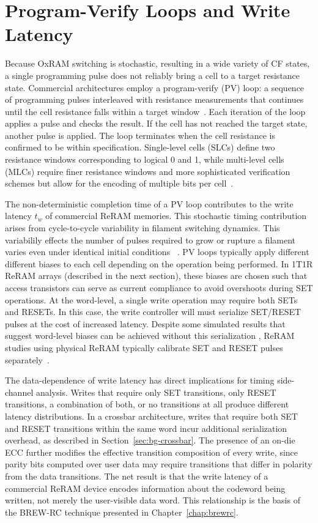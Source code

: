 \section{Program-Verify Loops and Write Latency}
\label{sec:bg-pvloops}

Because OxRAM switching is stochastic, resulting in a wide variety of CF
states, a single programming pulse does not reliably bring a cell to a
target resistance state. Commercial architectures employ a
program-verify (PV) loop: a sequence of programming pulses interleaved
with resistance measurements that continues until the cell resistance
falls within a target window~\cite{
	kawahara2013filament,hayakawa2015highly,grossi2015impact,mao2016optimizing,
	milo2021accurate, hung2021mlc}. Each iteration of the loop applies a
pulse and checks the result. If the cell has not reached the target
state, another pulse is applied. The loop terminates when the cell
resistance is confirmed to be within specification. Single-level cells
(SLCs) define two resistance windows corresponding to logical 0 and 1,
while multi-level cells (MLCs) require finer resistance windows and more
sophisticated verification schemes but allow for the encoding of
multiple bits per cell~\cite{hung2021mlc}.

The non-deterministic completion time of a PV loop contributes to the
write latency $t_w$ of commercial ReRAM memories. This stochastic timing
contribution arises from cycle-to-cycle variability in filament
switching dynamics. This variabilily effects the number of pulses
required to grow or rupture a filament varies even under identical
initial conditions ~\cite{yu2012switching, kawahara2013filament}. PV
loops typically apply different different biases to each cell depending
on the operation being performed. In 1T1R ReRAM arrays (described in the
next section), these biases are chosen such that access transistors can
serve as current compliance to avoid overshoots during SET operations.
At the word-level, a single write operation may require both SETs and
RESETs. In this case, the write controller will must serialize SET/RESET
pulses at the cost of increased latency. Despite some simulated results
that suggest word-level biases can be achieved without this
serialization \cite{mao2016optimizing}, ReRAM studies using physical
ReRAM typically calibrate SET and RESET pulses
separately~\cite{hayakawa2017resolving}.

The data-dependence of write latency has direct implications for timing
side-channel analysis. Writes that require only SET transitions, only
RESET transitions, a combination of both, or no transitions at all
produce different latency distributions. In a crossbar architecture,
writes that require both SET and RESET transitions within the same word
incur additional serialization overhead, as described in
Section~\ref{sec:bg-crossbar}. The presence of an on-die ECC further
modifies the effective transition composition of every write, since
parity bits computed over user data may require transitions that differ
in polarity from the data transitions. The net result is that the write
latency of a commercial ReRAM device encodes information about the
codeword being written, not merely the user-visible data word. This
relationship is the basis of the BREW-RC technique presented in
Chapter~\ref{chap:brewrc}.